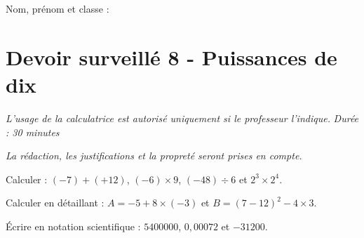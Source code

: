 \documentclass[a4paper,10pt]{report}
\begin{document}
\pagestyle{empty}
\noindent Nom, prénom et classe : \dotfill

\section*{Devoir surveillé 8 - Puissances de dix}

\noindent \textit{L'usage de la calculatrice est autorisé uniquement si le professeur l'indique.} \hfill \textit{Durée : 30 minutes}

\medskip
\noindent \textit{La rédaction, les justifications et la propreté seront prises en compte.}


\begin{ex}[Calculs]
Calculer : $(-7)+(+12)$, $(-6)\times 9$, $(-48)\div 6$ et $2^3\times2^4$.
\medskip\noindent\grandscarreaux{\linewidth}{4cm}
\end{ex}
\begin{ex}[Priorités]
Calculer en détaillant : $A=-5+8\times(-3)$ et $B=(7-12)^2-4\times3$.
\medskip\noindent\grandscarreaux{\linewidth}{4cm}
\end{ex}
\begin{ex}
Écrire en notation scientifique : $5400000$, $0,00072$ et $-31200$.
\medskip\noindent\grandscarreaux{\linewidth}{3cm}
\end{ex}
\end{document}
